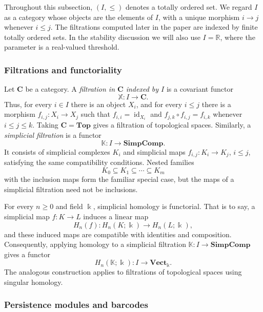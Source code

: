 \documentclass[a4paper,11pt]{article}
\theoremstyle{definition}
\theoremstyle{remark}
\DeclareMathOperator{\id}{id}
\begin{document}
Throughout this subsection, $(I,\leq)$ denotes a totally ordered set. We regard $I$ as a category whose objects are the elements of $I$, with a unique morphism $i\longrightarrow j$ whenever $i\leq j$. The filtrations computed later in the paper are indexed by finite totally ordered sets. In the stability discussion we will also use $I=\mathbb{R}$, where the parameter is a real-valued threshold.

\subsubsection*{Filtrations and functoriality}

Let $\mathbf{C}$ be a category. A \emph{filtration in $\mathbf{C}$ indexed by $I$} is a covariant functor
$$ \mathbb{X}\colon I\longrightarrow \mathbf{C}. $$
Thus, for every $i\in I$ there is an object $X_i$, and for every $i\leq j$ there is a morphism $f_{i,j}\colon X_i\longrightarrow X_j$ such that $f_{i,i}=\id_{X_i}$ and $f_{j,k}\circ f_{i,j}=f_{i,k}$ whenever $i\leq j\leq k$. Taking $\mathbf{C}=\mathbf{Top}$ gives a filtration of topological spaces. Similarly, a \emph{simplicial filtration} is a functor
$$ \mathbb{K}\colon I\longrightarrow \mathbf{SimpComp}. $$
It consists of simplicial complexes $K_i$ and simplicial maps $f_{i,j}\colon K_i\longrightarrow K_j$, $i\leq j$, satisfying the same compatibility conditions. Nested families
$$ K_0\subseteq K_1\subseteq\cdots\subseteq K_m $$
with the inclusion maps form the familiar special case, but the maps of a simplicial filtration need not be inclusions.

For every $n\geq 0$ and field $\Bbbk$, simplicial homology is functorial. That is to say, a simplicial map $f\colon K\longrightarrow L$ induces a linear map
$$ H_n(f)\colon H_n(K;\Bbbk)\longrightarrow H_n(L;\Bbbk), $$
and these induced maps are compatible with identities and composition. Consequently, applying homology to a simplicial filtration $\mathbb{K}\colon I\longrightarrow \mathbf{SimpComp}$ gives a functor
$$ H_n(\mathbb{K};\Bbbk)\colon I\longrightarrow \mathbf{Vect}_{\Bbbk}. $$
The analogous construction applies to filtrations of topological spaces using singular homology.

\subsubsection*{Persistence modules and barcodes}
\end{document}
